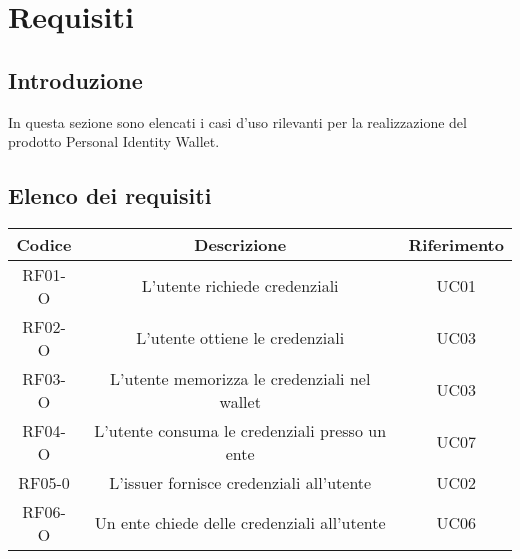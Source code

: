 \section{Requisiti}
\subsection{Introduzione}
In questa sezione sono elencati i casi d'uso rilevanti per la realizzazione del prodotto Personal Identity Wallet.
\subsection{Elenco dei requisiti}

    \begin{longtable}{|c|c|c|}
        \hline
        \textbf{Codice} & \textbf{Descrizione} & \textbf{Riferimento} \\
        \hline
        RF01-O & L'utente richiede credenziali& UC01\\
        RF02-O & L'utente ottiene le credenziali& UC03\\
        RF03-O & L'utente memorizza le credenziali nel wallet\glo{}& UC03\\
        RF04-O & L'utente consuma le credenziali presso un ente & UC07\\
        RF05-0 & L'issuer\glo{} fornisce credenziali all'utente & UC02\\
        RF06-O & Un ente chiede delle credenziali all'utente & UC06\\
        
        \hline
    \end{longtable}
